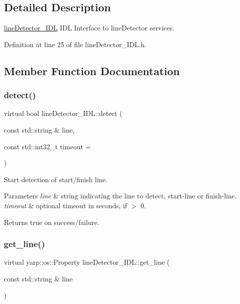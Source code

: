 \subsection{Detailed Description}
\hyperlink{classlineDetector__IDL}{line\+Detector\+\_\+\+I\+DL} I\+DL Interface to line\+Detector services. 

Definition at line 25 of file line\+Detector\+\_\+\+I\+D\+L.\+h.



\subsection{Member Function Documentation}
\mbox{\label{classlineDetector__IDL_a393124f2e4ea02a0ef2d4ba4df5d73c0}} 
\subsubsection{\texorpdfstring{detect()}{detect()}}
{\footnotesize\ttfamily virtual bool line\+Detector\+\_\+\+I\+D\+L\+::detect (\begin{DoxyParamCaption}\item[{const std\+::string \&}]{line,  }\item[{const std\+::int32\+\_\+t}]{timeout = {} }\end{DoxyParamCaption})\hspace{0.3cm}{\ttfamily [virtual]}}



Start detection of start/finish line. 


\begin{DoxyParams}{Parameters}
{\em line} & string indicating the line to detect, start-\/line or finish-\/line. \\
\hline
{\em timeout} & optional timeout in seconds, if $>$ 0. \\
\hline
\end{DoxyParams}
\begin{DoxyReturn}{Returns}
true on success/failure. 
\end{DoxyReturn}
\mbox{\label{classlineDetector__IDL_ae617a7505a800d086c201e047f32918b}} 
\subsubsection{\texorpdfstring{get\+\_\+line()}{get\_line()}}
{\footnotesize\ttfamily virtual yarp\+::os\+::\+Property line\+Detector\+\_\+\+I\+D\+L\+::get\+\_\+line (\begin{DoxyParamCaption}\item[{const std\+::string \&}]{line }\end{DoxyParamCaption})\hspace{0.3cm}{\ttfamily [virtual]}}



